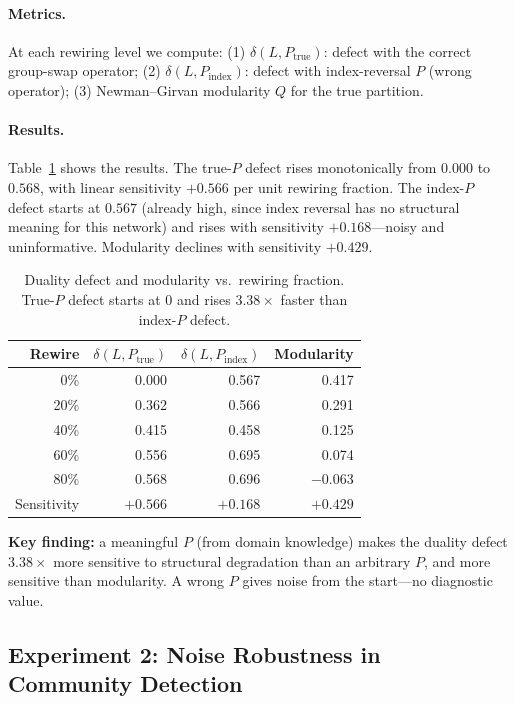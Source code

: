 \documentclass[11pt]{article}
\begin{document}
\paragraph{Metrics.}
At each rewiring level we compute:
(1) $\delta(L, P_{\text{true}})$: defect with the correct group-swap operator;
(2) $\delta(L, P_{\text{index}})$: defect with index-reversal $P$ (wrong operator);
(3) Newman--Girvan modularity $Q$ for the true partition.

\paragraph{Results.}
Table~\ref{tab:diagnostic} shows the results.
The true-$P$ defect rises monotonically from $0.000$ to $0.568$,
with linear sensitivity $+0.566$ per unit rewiring fraction.
The index-$P$ defect starts at $0.567$ (already high, since index
reversal has no structural meaning for this network) and rises with
sensitivity $+0.168$---noisy and uninformative.
Modularity declines with sensitivity $+0.429$.

\begin{table}[h]
\centering
\caption{Duality defect and modularity vs.\ rewiring fraction.
True-$P$ defect starts at 0 and rises $3.38\times$ faster than
index-$P$ defect.}
\label{tab:diagnostic}
\begin{tabular}{rrrr}
\toprule
Rewire & $\delta(L, P_{\text{true}})$ & $\delta(L, P_{\text{index}})$ & Modularity \\
\midrule
  0\% & 0.000 & 0.567 & 0.417 \\
 20\% & 0.362 & 0.566 & 0.291 \\
 40\% & 0.415 & 0.458 & 0.125 \\
 60\% & 0.556 & 0.695 & 0.074 \\
 80\% & 0.568 & 0.696 & $-$0.063 \\
\midrule
Sensitivity & $+0.566$ & $+0.168$ & $+0.429$ \\
\bottomrule
\end{tabular}
\end{table}

\textbf{Key finding:} a meaningful $P$ (from domain knowledge) makes
the duality defect $3.38\times$ more sensitive to structural degradation
than an arbitrary $P$, and more sensitive than modularity.
A wrong $P$ gives noise from the start---no diagnostic value.

\subsection{Experiment 2: Noise Robustness in Community Detection}
\end{document}
